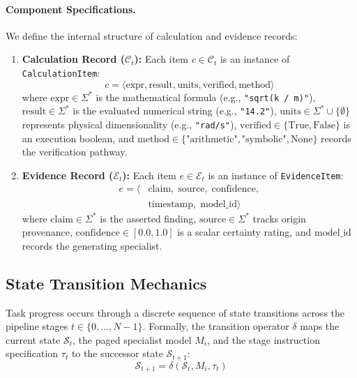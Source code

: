 \paragraph{Component Specifications.}
We define the internal structure of calculation and evidence records:
\begin{enumerate}
    \item \textbf{Calculation Record ($\mathcal{C}_t$):} Each item $c \in \mathcal{C}_t$ is an instance of \texttt{CalculationItem}:
    \begin{equation}
    c = \langle \text{expr}, \text{result}, \text{units}, \text{verified}, \text{method} \rangle
    \end{equation}
    where $\text{expr} \in \Sigma^*$ is the mathematical formula (e.g., \texttt{"sqrt(k / m)"}), $\text{result} \in \Sigma^*$ is the evaluated numerical string (e.g., \texttt{"14.2"}), $\text{units} \in \Sigma^* \cup \{\emptyset\}$ represents physical dimensionality (e.g., \texttt{"rad/s"}), $\text{verified} \in \{\text{True}, \text{False}\}$ is an execution boolean, and $\text{method} \in \{\text{"arithmetic"}, \text{"symbolic"}, \text{None}\}$ records the verification pathway.
    \item \textbf{Evidence Record ($\mathcal{E}_t$):} Each item $e \in \mathcal{E}_t$ is an instance of \texttt{EvidenceItem}:
    \begin{equation}
    \begin{aligned}
    e = \big\langle &\text{claim}, \;\text{source}, \;\text{confidence}, \\
    &\text{timestamp}, \;\text{model\_id} \big\rangle
    \end{aligned}
    \end{equation}
    where $\text{claim} \in \Sigma^*$ is the asserted finding, $\text{source} \in \Sigma^*$ tracks origin provenance, $\text{confidence} \in [0.0, 1.0]$ is a scalar certainty rating, and $\text{model\_id}$ records the generating specialist.
\end{enumerate}

\subsection{State Transition Mechanics}
\label{sec:transition_mechanics}

Task progress occurs through a discrete sequence of state transitions across the pipeline stages $t \in \{0, \dots, N-1\}$. Formally, the transition operator $\delta$ maps the current state $\mathcal{S}_t$, the paged specialist model $M_i$, and the stage instruction specification $\tau_t$ to the successor state $\mathcal{S}_{t+1}$:
\begin{equation}
\mathcal{S}_{t+1} = \delta(\mathcal{S}_t, M_i, \tau_t)
\end{equation}


